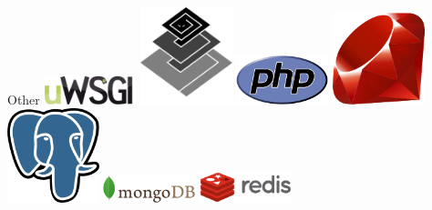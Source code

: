 \documentclass[aspectratio=169]{beamer}
\begin{document}
\begin{frame}{Other}
\includegraphics[width=0.2\textwidth]{uwsgi-logo.png}\hspace{0.5cm}
\includegraphics[width=0.2\textwidth]{twisted-logo.png}\hspace{0.5cm}
\includegraphics[width=0.2\textwidth]{php-logo.png}\hspace{0.5cm}
\includegraphics[width=0.2\textwidth]{ruby-logo.png}
\vspace{0.5cm}
\includegraphics[width=0.2\textwidth]{postgresql-logo.png}\hspace{0.5cm}
\includegraphics[width=0.2\textwidth]{mongodb-logo.png}\hspace{0.5cm}
\includegraphics[width=0.2\textwidth]{redis-logo.png}\hspace{0.5cm}
\end{frame}
\end{document}

